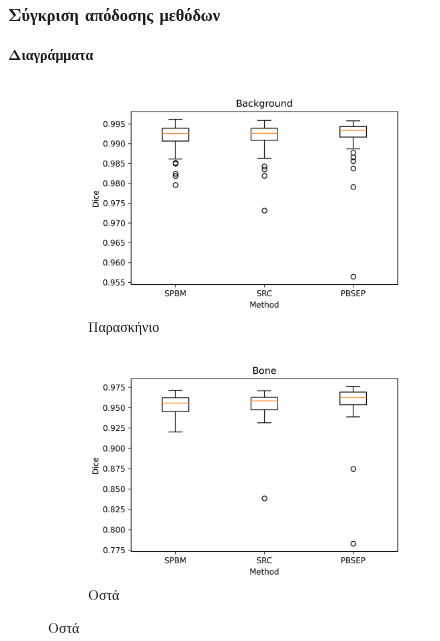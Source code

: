 \documentclass{beamer}
\begin{document}
\begin{frame}
\frametitle{Σύγκριση απόδοσης μεθόδων}
\framesubtitle{Διαγράμματα}

\begin{figure}[H]
    \centering

    \begin{subfigure}[b]{0.42\linewidth}
    \includegraphics[width=\linewidth]{Dice_final_Background_plot.png}
    \caption{Παρασκήνιο}
    \end{subfigure}
    \begin{subfigure}[b]{0.42\linewidth}
    \includegraphics[width=\linewidth]{Dice_final_Bone_plot.png}
    \caption{Οστά}
    \end{subfigure}


\end{figure}
\end{frame}
\end{document}
